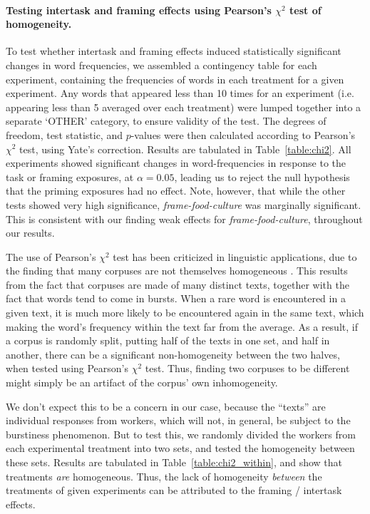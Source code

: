 \documentclass[12pt]{article}
\begin{document}
\paragraph{Testing intertask and framing effects using 
	Pearson's $\chi^2$ test of homogeneity.
}
To test whether intertask and framing effects induced statistically 
significant changes in word frequencies, we assembled a contingency table
for each experiment, containing the frequencies of words in each treatment
for a given experiment.  Any words that appeared less than 10 times for
an experiment (i.e. appearing less than 5 averaged over each treatment)
were lumped together into a separate `OTHER' category, to ensure validity
of the test.  The degrees of freedom, test statistic, and $p$-values were
then calculated according to Pearson's $\chi^2$ test, using 
Yate's correction.  Results are tabulated in Table~\ref{table:chi2}.
All experiments showed significant changes in word-frequencies in response
to the task or framing exposures, at $\alpha=0.05$, leading us to 
reject the null hypothesis that the priming exposures had no effect.
Note, however, that while the other tests showed very high significance, 
\textit{frame-food-culture} was marginally significant.  This is consistent 
with our finding weak effects for \textit{frame-food-culture}, throughout our 
results.

The use of Pearson's $\chi^2$ test has been criticized in linguistic 
applications, due to the finding that many corpuses are not themselves
homogeneous \cite{kilgarriff1996comparing}.  
This results from the fact that corpuses are made of many
distinct texts, together with the fact that words tend to come in bursts.
When a rare word is encountered in a given text, it is much more likely
to be encountered again in the same text, which making the word's frequency
within the text far from the average.  As a result,
if a corpus is randomly split, putting half of the texts in one set, 
and half in another, there can be a significant non-homogeneity between the 
two halves, when tested using Pearson's $\chi^2$ test.  Thus, finding two
corpuses to be different might simply be an artifact of the corpus' own
inhomogeneity.

We don't expect this to be a concern in our case, because the ``texts'' are 
individual responses from workers, which will not, in general, be subject to 
the burstiness phenomenon.  But to test this, we randomly divided the workers 
from each experimental treatment into two sets, and tested the homogeneity 
between these sets.  Results are tabulated in Table~\ref{table:chi2_within}, 
and show that treatments 
\textit{are} homogeneous.  Thus, the lack of homogeneity \textit{between} 
the treatments of given experiments can be attributed to the framing / 
intertask effects.
\end{document}
